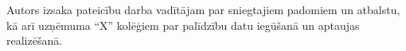 \frontmatterpage
{}
Autors izsaka pateicību darba vadītājam par sniegtajiem padomiem un atbalstu, kā arī uzņēmuma “X” kolēģiem par palīdzību datu iegūšanā un aptaujas realizēšanā.
